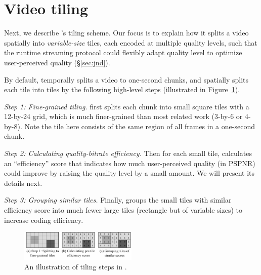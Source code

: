 
\section{Video tiling}
\label{sec:tiling}

Next, we describe \name's tiling scheme.
Our focus is to explain how it splits a video spatially into {\em variable-size} tiles, each encoded at multiple quality levels, such that the runtime streaming protocol could flexibly adapt quality level to optimize user-perceived quality (\S\ref{sec:jnd}).

By default, \name temporally splits a video to one-second chunks, and spatially splits each tile into tiles by the following high-level steps (illustrated in Figure~\ref{fig:tiling-steps}).
\begin{packeditemize}
\item {\em Step 1: Fine-grained tiling.} 
\name first splits each chunk into small square tiles with a 12-by-24 grid, which is much finer-grained than most related work (3-by-6 or 4-by-8). Note the tile here consists of the same region of all frames in a one-second chunk.
\item {\em Step 2: Calculating quality-bitrate efficiency.} 
Then for each small tile, \name calculates an ``efficiency'' score that indicates how much user-perceived quality (in PSPNR) could improve by raising the quality level by a small amount. We will present its details next.
\item {\em Step 3: Grouping similar tiles.}
Finally, \name groups the small tiles with similar efficiency score into much fewer large tiles (rectangle but of variable sizes) to increase coding efficiency. 
\end{packeditemize}


\begin{figure}
  \centering
  \includegraphics[width=0.5\textwidth]{figures/tiling-steps.pdf}
  \caption{An illustration of tiling steps in \name.}
  \label{fig:tiling-steps}
\end{figure}

